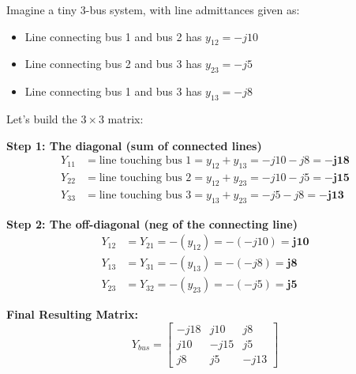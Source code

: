 \documentclass[11pt]{article}
\begin{document}
\begin{stepbox}
Imagine a tiny 3-bus system, with line admittances given as:
\begin{itemize}
    \item Line connecting bus 1 and bus 2 has $y_{12} = -j10$
    \item Line connecting bus 2 and bus 3 has $y_{23} = -j5$
    \item Line connecting bus 1 and bus 3 has $y_{13} = -j8$
\end{itemize}

Let's build the $3 \times 3$ matrix:

\vspace{0.2cm}
\textbf{Step 1: The diagonal (sum of connected lines)}
\begin{align*}
    Y_{11} &= \text{line touching bus 1} = y_{12} + y_{13} = -j10 - j8 = \mathbf{-j18} \\
    Y_{22} &= \text{line touching bus 2} = y_{12} + y_{23} = -j10 - j5 = \mathbf{-j15} \\
    Y_{33} &= \text{line touching bus 3} = y_{13} + y_{23} = -j5 - j8 = \mathbf{-j13}
\end{align*}

\textbf{Step 2: The off-diagonal (neg of the connecting line)}
\begin{align*}
    Y_{12} &= Y_{21} = -(y_{12}) = -(-j10) = \mathbf{j10} \\
    Y_{13} &= Y_{31} = -(y_{13}) = -(-j8) = \mathbf{j8} \\
    Y_{23} &= Y_{32} = -(y_{23}) = -(-j5) = \mathbf{j5}
\end{align*}

\vspace{0.2cm}
\textbf{Final Resulting Matrix:}
\begin{equation*}
    Y_{bus} = 
    \begin{bmatrix}
    -j18 & j10 & j8 \\
    j10 & -j15 & j5 \\
    j8 & j5 & -j13
    \end{bmatrix}
\end{equation*}
\end{stepbox}
\end{document}

